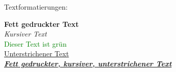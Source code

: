\documentclass[12pt]{article}
\begin{document}
Textformatierungen:

\color{red}
\textbf{Fett gedruckter Text} \\
\textit{Kursiver Text} \\
\textcolor{green}{Dieser Text ist grün} \\
\underline{Unterstrichener Text} \\
\textbf{\textit{\underline{Fett gedruckter, kursiver, unterstrichener Text}}}
\end{document}
